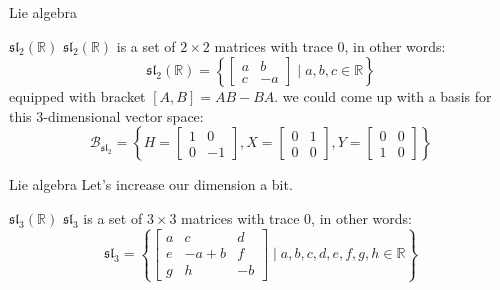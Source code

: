 \documentclass{beamer}
\newcommand{\R}{\mathbb{R}}
\begin{document}
\begin{frame}{Lie algebra}
	\begin{exm}{$\mathfrak{sl}_2(\R)$}{}
		$\mathfrak{sl}_2(\R)$ is a set of  $2 \times 2$ matrices with trace  $0$, in other words:
	\[
		\mathfrak{sl}_2(\R) = \left\{ \begin{bmatrix} a & b \\ c & -a \end{bmatrix} \mid a,b,c \in \R  \right\} 
	\] equipped with bracket $[A,B] = AB - BA$.
\tcblower
we could come up with a basis for this $3$-dimensional vector space:  \[
	\mathcal{B}_{\mathfrak{sl}_2} = \left\{ H = \begin{bmatrix} 1 & 0 \\ 0 &-1 \end{bmatrix}, X =\begin{bmatrix} 0 & 1 \\ 0 &0 \end{bmatrix}, Y = \begin{bmatrix} 0 & 0 \\ 1 &0 \end{bmatrix} \right\} 
\] 
\end{exm}
\end{frame}


\begin{frame}{Lie algebra}
Let's increase our dimension a bit.

\begin{exm}{$\mathfrak{sl}_3(\R)$}{}
	$\mathfrak{sl}_{3}$ is a set of $3 \times 3$ matrices with trace 0, in other words:  \[
		\mathfrak{sl}_{3} = \left\{ \begin{bmatrix} a & c & d \\
		e & -a+b & f \\ g & h & -b\end{bmatrix} \mid a,b,c,d,e,f,g,h \in \R \right\} 
	\] 
\end{exm}

\end{frame}
\end{document}
